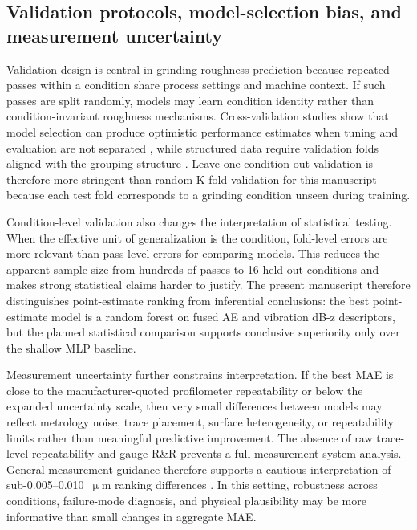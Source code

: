 \subsection{Validation protocols, model-selection bias, and measurement uncertainty}\label{rw:validation}

Validation design is central in grinding roughness prediction because repeated passes within a condition share process settings and machine context. If such passes are split randomly, models may learn condition identity rather than condition-invariant roughness mechanisms. Cross-validation studies show that model selection can produce optimistic performance estimates when tuning and evaluation are not separated \cite{varma2006bias}, while structured data require validation folds aligned with the grouping structure \cite{Roberts2017}. Leave-one-condition-out validation is therefore more stringent than random K-fold validation for this manuscript because each test fold corresponds to a grinding condition unseen during training.

Condition-level validation also changes the interpretation of statistical testing. When the effective unit of generalization is the condition, fold-level errors are more relevant than pass-level errors for comparing models. This reduces the apparent sample size from hundreds of passes to 16 held-out conditions and makes strong statistical claims harder to justify. The present manuscript therefore distinguishes point-estimate ranking from inferential conclusions: the best point-estimate model is a random forest on fused AE and vibration dB-z descriptors, but the planned statistical comparison supports conclusive superiority only over the shallow MLP baseline.

Measurement uncertainty further constrains interpretation. If the best MAE is close to the manufacturer-quoted profilometer repeatability or below the expanded uncertainty scale, then very small differences between models may reflect metrology noise, trace placement, surface heterogeneity, or repeatability limits rather than meaningful predictive improvement. The absence of raw trace-level repeatability and gauge R\&R prevents a full measurement-system analysis. General measurement guidance therefore supports a cautious interpretation of sub-0.005--0.010~\(\upmu\)m ranking differences \cite{JCGM2008}. In this setting, robustness across conditions, failure-mode diagnosis, and physical plausibility may be more informative than small changes in aggregate MAE.

